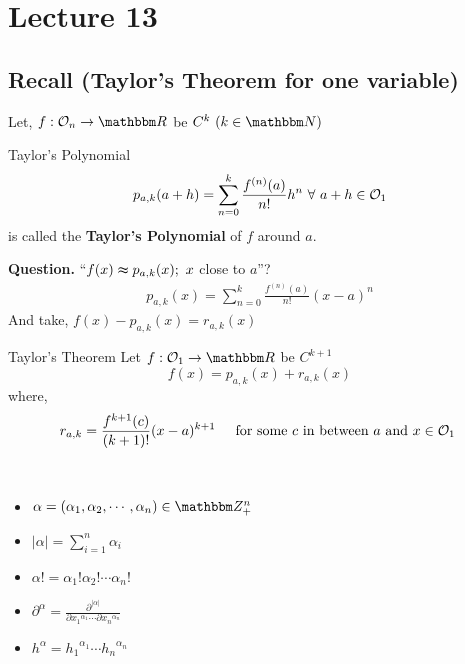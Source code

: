 \documentclass[../Analysis-3]{subfiles}
\begin{document}
\chapter*{Lecture 13} %
\setcounter{chapter}{13} %
\setcounter{section}{0}

\section{Recall (Taylor's Theorem for one variable)}

Let, $ f : \Op{n} \to \R $ be $C^k \ (k \in \N)$

\begin{Def}{Taylor's Polynomial}{}
    \[ p_{a,k}(a+h) = \sum_{n = 0}^{k} \frac{f^{(n)}(a)}{n!} h^{n} \ \forall\ a+h \in \mathcal{O}_{1} \]
    is called the \textbf{Taylor's Polynomial} of $f$ around $a$.
\end{Def}

\textbf{Question.} ``$f(x) \thickapprox  p_{a,k}(x);\ x$ close to $a$''?
\begin{align*}
    p_{a,k}(x) = \sum_{n = 0}^{k} \frac{f^{(n)}(a)}{n!} (x-a)^{n}
\end{align*}
And take, $f(x) - p_{a,k}(x) = r_{a,k}(x)$

\begin{Thm}{Taylor's Theorem}{}
    Let $ f: \Op{1} \to \R $ be $C^{k+1}$
    \[ f(x) = p_{a,k}(x) + r_{a,k}(x) \]
    where, \[r_{a,k} = \frac{f^{k+1}(c)}{(k+1)!} (x-a)^{k+1} \hspace{5mm} \text{for some $c$ in between $a$ and $x \in \mathcal{O}_{1}$ }\]
\end{Thm}

\

\begin{notnBox}{}{}
    
\begin{itemize}
  \item  $\alpha = ( \alpha_1 , \alpha_2 , \cdots , \alpha_n) \in \Z_{+}^{n}$ \\
  \item $ |\alpha| = \sum_{i = 1}^{n} \alpha_i $ \\
  \item $\alpha ! = \alpha_1 ! \alpha_2 ! \cdots \alpha_n !$ \\
  \item $ \partial^{\alpha} = \frac{\partial^{|\alpha|}}{\partial {x_1}^{\alpha_1} \cdots \partial {x_n}^{\alpha_n}}$ \\
  \item $ h^{\alpha} = {h_1}^{\alpha_1} \cdots {h_n}^{\alpha_n}$

\end{itemize}



\end{notnBox}
\end{document}
